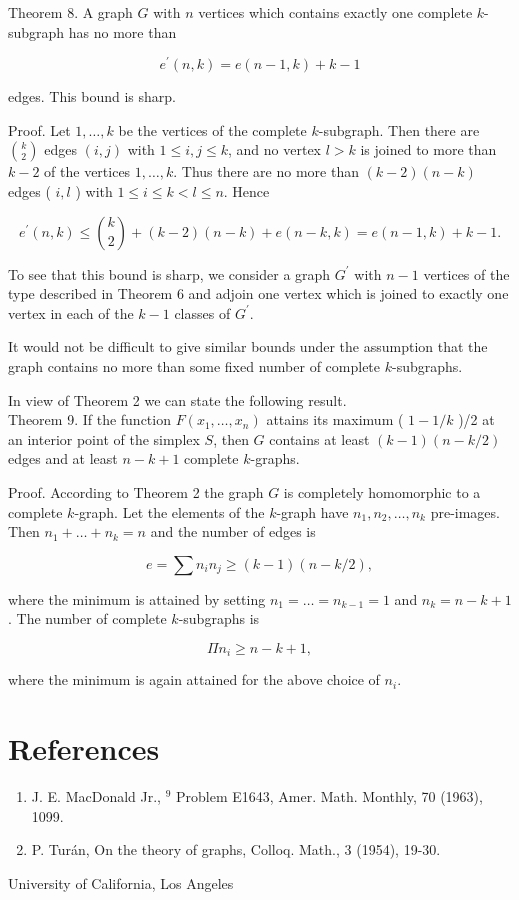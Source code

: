 \documentclass[10pt]{article}
\begin{document}
Theorem 8. A graph \(G\) with \(n\) vertices which contains exactly one complete \(k\)-subgraph has no more than

\[
e^{\prime}(n, k)=e(n-1, k)+k-1
\]

edges. This bound is sharp.

Proof. Let \(1, \ldots, k\) be the vertices of the complete \(k\)-subgraph. Then there are \(\binom{k}{2}\) edges \((i, j)\) with \(1 \leqslant i, j \leqslant k\), and no vertex \(l>k\) is joined to more than \(k-2\) of the vertices \(1, \ldots, k\). Thus there are no more than \((k-2)(n-k)\) edges ( \(i, l\) ) with \(1 \leqslant i \leqslant k<l \leqslant n\). Hence

\[
e^{\prime}(n, k) \leqslant\binom{ k}{2}+(k-2)(n-k)+e(n-k, k)=e(n-1, k)+k-1 .
\]

To see that this bound is sharp, we consider a graph \(G^{\prime}\) with \(n-1\) vertices of the type described in Theorem 6 and adjoin one vertex which is joined to exactly one vertex in each of the \(k-1\) classes of \(G^{\prime}\).

It would not be difficult to give similar bounds under the assumption that the graph contains no more than some fixed number of complete \(k\)-subgraphs.

In view of Theorem 2 we can state the following result.\\
Theorem 9. If the function \(F\left(x_{1}, \ldots, x_{n}\right)\) attains its maximum ( \(1-1 / k\) )/2 at an interior point of the simplex \(S\), then \(G\) contains at least \((k-1)(n-k / 2)\) edges and at least \(n-k+1\) complete \(k\)-graphs.

Proof. According to Theorem 2 the graph \(G\) is completely homomorphic to a complete \(k\)-graph. Let the elements of the \(k\)-graph have \(n_{1}, n_{2}, \ldots, n_{k}\) pre-images. Then \(n_{1}+\ldots+n_{k}=n\) and the number of edges is

\[
e=\sum n_{i} n_{j} \geqslant(k-1)(n-k / 2),
\]

where the minimum is attained by setting \(n_{1}=\ldots=n_{k-1}=1\) and \(n_{k}=n-k+1\). The number of complete \(k\)-subgraphs is

\[
\Pi n_{i} \geqslant n-k+1,
\]

where the minimum is again attained for the above choice of \(n_{i}\).

\section*{References}
\begin{enumerate}
  \item J. E. MacDonald Jr., \({ }^{9}\) Problem E1643, Amer. Math. Monthly, 70 (1963), 1099.
  \item P. Turán, On the theory of graphs, Colloq. Math., 3 (1954), 19-30.
\end{enumerate}

University of California, Los Angeles
\end{document}

